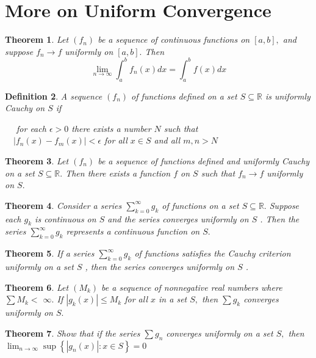 \documentclass[12pt]{article}
\newtheorem{theorem}{Theorem}[section]
\newtheorem{definition}[theorem]{Definition}
\begin{document}
\section{More on Uniform Convergence}
\begin{theorem}
	Let $\left( f _ { n } \right)$ be a sequence of continuous functions on $[ a , b ] ,$ and suppose
	$f _ { n } \rightarrow f$ uniformly on $[ a , b ] .$ Then
	$$\lim _ { n \rightarrow \infty } \int _ { a } ^ { b } f _ { n } ( x ) d x = \int _ { a } ^ { b } f ( x ) d x$$
\end{theorem}
\begin{definition}
	A sequence $\left( f _ { n } \right)$ of functions defined on a set $S \subseteq \mathbb { R }$ is uniformly
	Cauchy on $S$ if
	\begin{center}
			$\quad$ for each $\epsilon > 0$ there exists a number $N$ such that\\
		$\quad \left| f _ { n } ( x ) - f _ { m } ( x ) \right| < \epsilon$ for all $x \in S$ and all $m , n > N$
	\end{center}

\end{definition}
\begin{theorem}
	Let $\left( f _ { n } \right)$ be a sequence of functions defined and uniformly Cauchy on
	a set $S \subseteq \mathbb { R } .$ Then there exists a function $f$ on $S$ such that $f _ { n } \rightarrow f$
	uniformly on $S .$
\end{theorem}

\begin{theorem}
	Consider a series $\sum _ { k = 0 } ^ { \infty } g _ { k }$ of functions on a set $S \subseteq \mathbb { R } .$ Suppose
	each $g _ { k }$ is continuous on $S$ and the series converges uniformly on $S$ .
	Then the series $\sum _ { k = 0 } ^ { \infty } g _ { k }$ represents a continuous function on $S .$
\end{theorem}
\begin{theorem}
	If a series $\sum _ { k = 0 } ^ { \infty } g _ { k }$ of functions satisfies the Cauchy criterion
	uniformly on a set $S$ , then the series converges uniformly on $S$ .
\end{theorem}
\begin{theorem}
	Let $\left( M _ { k } \right)$ be a sequence of nonnegative real numbers where $\sum M _ { k } <$
	$\infty .$ If $\left| g _ { k } ( x ) \right| \leq M _ { k }$ for all $x$ in a set $S ,$ then $\sum g _ { k }$ converges
	uniformly on $S .$
\end{theorem}
\begin{theorem}
	Show that if the series $\sum g _ { n }$ converges uniformly on a set $S ,$ then
	$\lim _ { n \rightarrow \infty } \sup \left\{ \left| g _ { n } ( x ) \right| : x \in S \right\} = 0$
\end{theorem}
\end{document}
